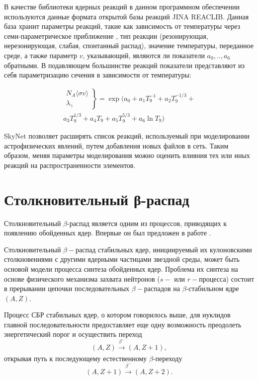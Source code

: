 \documentclass[14pt, a4paper]{article}
\begin{document}
В качестве библиотеки ядерных реакций в данном программном обеспечении используются данные формата открытой базы реакций JINA REACLIB.  Данная база хранит параметры реакций, такие как зависимость от температуры через семи-параметрическое приближение \cite{jina}, тип реакции (резонирующая, нерезонирующая, слабая, спонтанный распад), значение температуры, переданное среде, а также параметр $v$, указывающий, являются ли показатели $a_0, .., a_6$ обратными. В подавляющем большинстве реакций показатели представляют из себя параметризацию сечения в зависимости от температуры:

\begin{equation}
\label{eq:system}
\begin{split}
\left.
\begin{array}{ccc}
N_{A}\langle \sigma v \rangle \\
\lambda_\gamma
\end{array}
\right\}
= \exp (a_0 + a_1 T_9^{-1} + a_2 T_9^{-1/3} + \\
a_3 T_9^{1/3} + a_4 T_9 + a_5 T_9^{5/3} + a_6 \ln T_9)
\end{split}
\end{equation}

SkyNet позволяет расширять список реакций, используемый при моделировании астрофизических явлений,  путем добавления новых файлов в сеть. Таким образом, меняя параметры моделирования можно оценить влияния тех или иных реакций на распространенности элементов.


\section{Столкновительный β-распад}
Столкновительный $\beta$-распад является одним из процессов, приводящих к появлению обойденных ядер. Впервые он был предложен в работе \cite{batkin}. 

Столкновительный $\beta-$распад стабильных ядер, инициируемый их кулоновскими столкновениями с другими ядерными частицами звездной среды, может быть основой модели процесса синтеза обойденных ядер.
Проблема их синтеза на основе физического механизма захвата нейтронов ($s-$ или $r-$процесса) состоит в прерывании цепочки последовательных $\beta-$распадов на $\beta$-стабильном ядре $(A,Z)$.

Процесс СБР стабильных ядер, о котором говорилось выше, для нуклидов главной последовательности предоставляет еще одну возможность преодолеть энергетический порог и осуществить переход 
$$(A,Z) \xrightarrow[]{\beta^-} (A,Z + 1),$$
открывая путь к последующему естественному $\beta$-переходу
$$(A,Z+1) \xrightarrow[]{\beta^-} (A,Z + 2).$$
\end{document}
